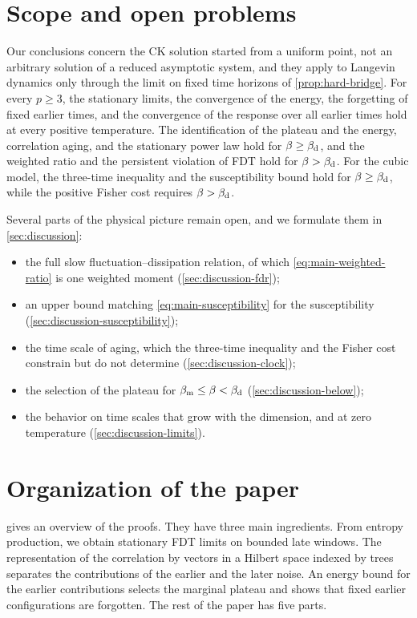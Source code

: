 \section{Scope and open problems}\label{sec:intro-scope}

Our conclusions concern the CK solution started from a uniform point, not an arbitrary solution of a reduced asymptotic system, and they apply to Langevin dynamics only through the limit on fixed time horizons of \cref{prop:hard-bridge}. For every $p\ge3$, the stationary limits, the convergence of the energy, the forgetting of fixed earlier times, and the convergence of the response over all earlier times hold at every positive temperature. The identification of the plateau and the energy, correlation aging, and the stationary power law hold for $\beta\ge\beta_{\mathrm d}$, and the weighted ratio and the persistent violation of FDT hold for $\beta>\beta_{\mathrm d}$. For the cubic model, the three-time inequality and the susceptibility bound hold for $\beta\ge\beta_{\mathrm d}$, while the positive Fisher cost requires $\beta>\beta_{\mathrm d}$.

Several parts of the physical picture remain open, and we formulate them in \cref{sec:discussion}:
\begin{itemize}
\item the full slow fluctuation--dissipation relation, of which \eqref{eq:main-weighted-ratio} is one weighted moment (\cref{sec:discussion-fdr});
\item an upper bound matching \eqref{eq:main-susceptibility} for the susceptibility (\cref{sec:discussion-susceptibility});
\item the time scale of aging, which the three-time inequality and the Fisher cost constrain but do not determine (\cref{sec:discussion-clock});
\item the selection of the plateau for $\beta_{\mathrm m}\le\beta<\beta_{\mathrm d}$ (\cref{sec:discussion-below});
\item the behavior on time scales that grow with the dimension, and at zero temperature (\cref{sec:discussion-limits}).
\end{itemize}

\section{Organization of the paper}\label{sec:intro-organization}

 gives an overview of the proofs. They have three main ingredients. From entropy production, we obtain stationary FDT limits on bounded late windows. The representation of the correlation by vectors in a Hilbert space indexed by trees separates the contributions of the earlier and the later noise. An energy bound for the earlier contributions selects the marginal plateau and shows that fixed earlier configurations are forgotten. The rest of the paper has five parts.

